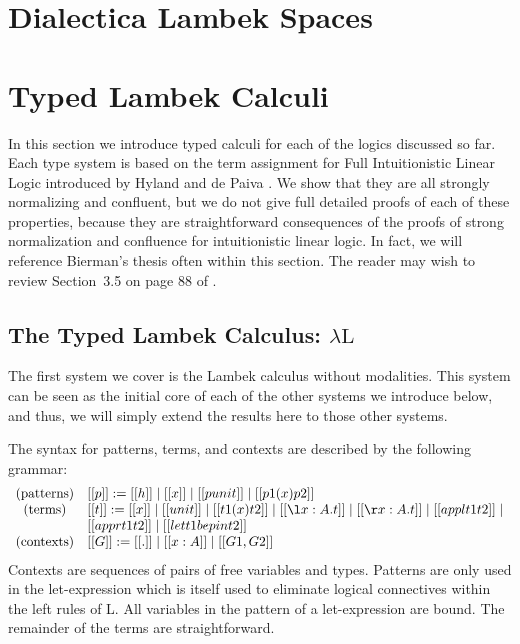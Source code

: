 \documentclass{article}
\begin{document}
\section{Dialectica Lambek Spaces}
\label{sec:dialectica_lambek_spaces}


\section{Typed Lambek Calculi}
\label{sec:typed_lambek_calculi}
In this section we introduce typed calculi for each of the logics
discussed so far.  Each type system is based on the term assignment
for Full Intuitionistic Linear Logic introduced by Hyland and de Paiva
\cite{Hyland:1993}.  We show that they are all strongly normalizing
and confluent, but we do not give full detailed proofs of each of
these properties, because they are straightforward consequences of the
proofs of strong normalization and confluence for intuitionistic
linear logic.  In fact, we will reference Bierman's thesis often
within this section.  The reader may wish to review Section~3.5 on
page 88 of \cite{Bierman:1994}.

\subsection{The Typed Lambek Calculus: $\lambda\text{L}$}
\label{subsec:the_typed_lambek_calculus_lambda-l}

The first system we cover is the Lambek calculus without
modalities. This system can be seen as the initial core of each of the
other systems we introduce below, and thus, we will simply extend the
results here to those other systems.  

The syntax for patterns, terms, and contexts are described by the
following grammar:
\[
\begin{array}{cll}
  \text{(patterns)} & [[p]] := [[h]] \mid [[x]] \mid [[punit]] \mid [[p1 (x) p2]]\\
  \text{(terms)}    & [[t]] := [[x]] \mid [[unit]] \mid [[t1 (x) t2]] \mid [[\l x : A.t]] \mid [[\r x : A.t]] \mid
  [[appl t1 t2]] \mid \\ & [[appr t1 t2]] \mid [[let t1 be p in t2]]\\
  \text{(contexts)} & [[G]] := [[.]] \mid [[x : A]] \mid [[G1,G2]]\\
\end{array}
\]
Contexts are sequences of pairs of free variables and types.  Patterns
are only used in the let-expression which is itself used to eliminate
logical connectives within the left rules of L.  All variables in the
pattern of a let-expression are bound.  The remainder of the terms are
straightforward.
\end{document}

